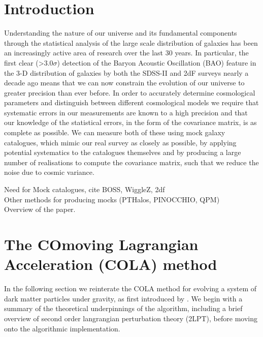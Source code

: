 \documentclass[5p,authoryear]{elsarticle}
\begin{document}
\section{Introduction}
Understanding the nature of our universe and its fundamental components through the statistical analysis of the large scale distribution of galaxies has been an increasingly active area of research over the last 30 years. In particular, the first clear (>3.0$\sigma$) detection of the Baryon Acoustic Oscillation (BAO) feature in the 3-D distribution of galaxies by both the SDSS-II \citep{Eisenstein:2005} and 2dF \citep{Cole:2005} surveys nearly a decade ago means that we can now constrain the evolution of our universe to greater precision than ever before. In order to accurately determine cosmological parameters and distinguish between different cosmological models we require that systematic errors in our measurements are known to a high precision and that our knowledge of the statistical errors, in the form of the covariance matrix, is as complete as possible. We can measure both of these using mock galaxy catalogues, which mimic our real survey as closely as possible, by applying potential systematics to the catalogues themselves and by producing a large number of realisations to compute the covariance matrix, such that we reduce the noise due to cosmic variance.



Need for Mock catalogues, cite BOSS, WiggleZ, 2df \\
Other methods for producing mocks (PTHalos, PINOCCHIO, QPM) \\
Overview of the paper.

\section{The COmoving Lagrangian Acceleration (COLA) method}

In the following section we reinterate the  COLA method for evolving a system of dark matter particles under gravity, as first introduced by \cite{Tassev2013}. We begin with a summary of the theoretical underpinnings of the algorithm, including a brief overview of second order langrangian perturbation theory (2LPT), before moving onto the algorithmic implementation.
\end{document}
